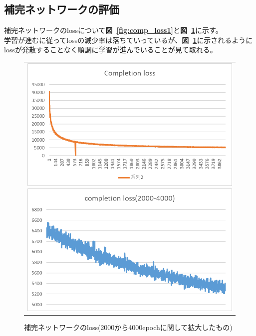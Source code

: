 \documentclass[a4j, 11pt]{jreport}
\newcommand{\figref}[1]{\textbf{図~\ref{#1}}}
\begin{document}
\subsection{補完ネットワークの評価}
補完ネットワークのlossについて\figref{fig:comp_loss1}と\figref{fig:comp_loss2}に示す。\\
学習が進むに従ってlossの減少率は落ちていっているが、\figref{fig:comp_loss2}に示されるようにlossが発散することなく順調に学習が進んでいることが見て取れる。
\begin{figure}[H]
	\centering
	  \begin{tabular}{c}
		\begin{minipage}{0.50\hsize}
		  \centering
			\includegraphics[scale=0.5]
			{images/result/loss/completion_loss1.png}
			\caption{補完ネットワークのloss}
			\label{fig:comp_loss1}
		\end{minipage}
   
   
		\begin{minipage}{0.50\hsize}
		  \centering
			\includegraphics[scale=0.5]
							{images/result/loss/completion_loss2.png}
							\caption{補完ネットワークのloss(2000から4000epochに関して拡大したもの)}
							\label{fig:comp_loss2}
		\end{minipage} \\
	\end{tabular}
\end{figure}  
\end{document}
